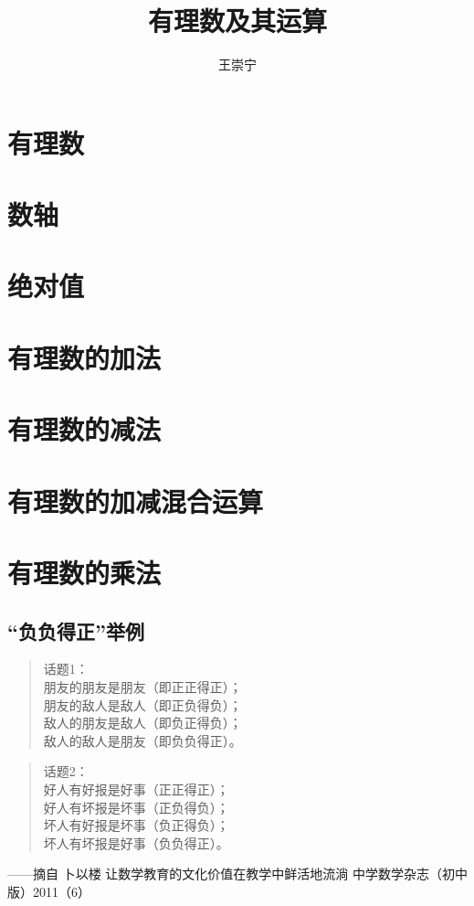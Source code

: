 \documentclass{article}
\title{有理数及其运算}
\author{王崇宁}
\begin{document}
\section{有理数}
\section{数轴}
\section{绝对值}
\section{有理数的加法}
\section{有理数的减法}
\section{有理数的加减混合运算}
\section{有理数的乘法}
  \subsection{“负负得正”举例}
    \begin{verse}
      话题1：\\
      朋友的朋友是朋友（即正正得正）；\\
      朋友的敌人是敌人（即正负得负）；\\
      敌人的朋友是敌人（即负正得负）；\\
      敌人的敌人是朋友（即负负得正）。\\
    \end{verse}
    \begin{verse}
话题2：\\
好人有好报是好事（正正得正）；\\
好人有坏报是坏事（正负得负）；\\
坏人有好报是坏事（负正得负）；\\
坏人有坏报是好事（负负得正）。
\end{verse}
——摘自 卜以楼 让数学教育的文化价值在教学中鲜活地流淌 中学数学杂志（初中版）2011（6）
\subsection{}
\end{document}
